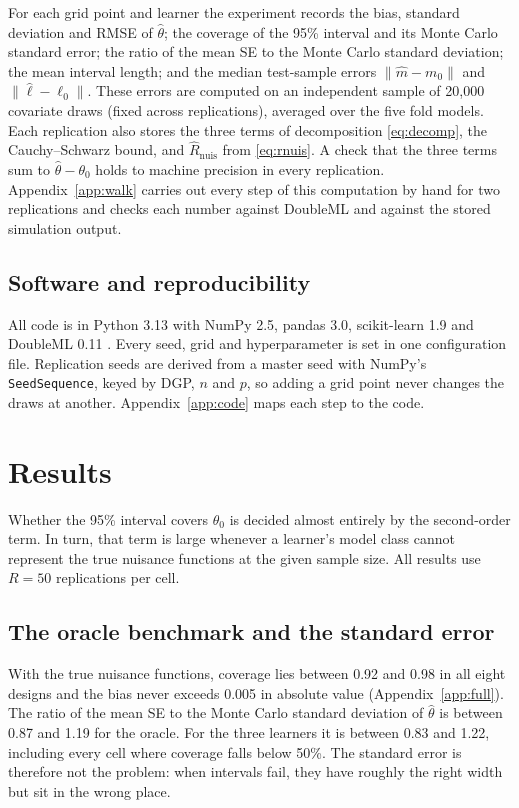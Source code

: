 \documentclass[11pt,a4paper]{article}
\newcommand{\Rnuis}{\hat R_{\mathrm{nuis}}}
\newcommand{\code}[1]{\texttt{#1}}
\begin{document}
For each grid point and learner the experiment records the bias, standard deviation and RMSE of $\hat\theta$; the coverage of the 95\% interval and its Monte Carlo standard error; the ratio of the mean SE to the Monte Carlo standard deviation; the mean interval length; and the median test-sample errors $\|\hat m-m_0\|$ and $\|\hat\ell-\ell_0\|$. These errors are computed on an independent sample of 20,000 covariate draws (fixed across replications), averaged over the five fold models. Each replication also stores the three terms of decomposition \eqref{eq:decomp}, the Cauchy--Schwarz bound, and $\Rnuis$ from \eqref{eq:rnuis}. A check that the three terms sum to $\hat\theta-\theta_0$ holds to machine precision in every replication. Appendix~\ref{app:walk} carries out every step of this computation by hand for two replications and checks each number against DoubleML and against the stored simulation output.

\subsection{Software and reproducibility}

All code is in Python 3.13 with NumPy 2.5, pandas 3.0, scikit-learn 1.9 \citep{pedregosa2011} and DoubleML 0.11 \citep{bach2022}. Every seed, grid and hyperparameter is set in one configuration file. Replication seeds are derived from a master seed with NumPy's \code{SeedSequence}, keyed by DGP, $n$ and $p$, so adding a grid point never changes the draws at another. Appendix~\ref{app:code} maps each step to the code.

\section{Results}\label{sec:results}

Whether the 95\% interval covers $\theta_0$ is decided almost entirely by the second-order term. In turn, that term is large whenever a learner's model class cannot represent the true nuisance functions at the given sample size. All results use $R=50$ replications per cell.

\subsection{The oracle benchmark and the standard error}

With the true nuisance functions, coverage lies between 0.92 and 0.98 in all eight designs and the bias never exceeds 0.005 in absolute value (Appendix~\ref{app:full}). The ratio of the mean SE to the Monte Carlo standard deviation of $\hat\theta$ is between 0.87 and 1.19 for the oracle. For the three learners it is between 0.83 and 1.22, including every cell where coverage falls below 50\%. The standard error is therefore not the problem: when intervals fail, they have roughly the right width but sit in the wrong place.
\end{document}
